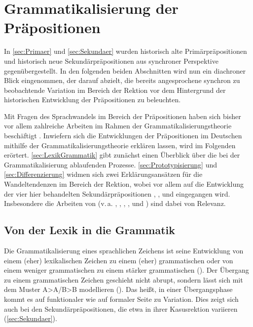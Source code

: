 \section{Grammatikalisierung der Präpositionen}\label{sec:Grammatikalisierung}
In \autoref{sec:Primaer} und \autoref{sec:Sekundaer} wurden historisch alte Primärpräpositionen und historisch neue Sekundärpräpositionen aus synchroner Perspektive gegenübergestellt. 
In den folgenden beiden Abschnitten wird nun ein diachroner Blick eingenommen, der darauf abzielt, die bereits angesprochene synchron zu beobachtende Variation im Bereich der Rektion vor dem Hintergrund der historischen Entwicklung der Präpositionen zu beleuchten.

Mit Fragen des Sprachwandels im Bereich der Präpositionen haben sich bisher vor allem zahlreiche Arbeiten im Rahmen der Grammatikalisierungstheorie beschäftigt \citep[etwa][]{Lehmann1992, Lindqvist1994,  DiMeola2000, Szczepaniak2011}. 
Inwiefern sich die Entwicklungen der Präpositionen im Deutschen mithilfe der Grammatikalisierungstheorie erklären lassen, wird im Folgenden erörtert. \autoref{sec:LexikGrammatik} gibt zunächst einen Überblick über die bei der Grammatikalisierung ablaufenden Prozesse. 
\autoref{sec:Prototypisierung} und \autoref{sec:Differenzierung} widmen sich zwei Erklärungsansätzen für die Wandeltendenzen im Bereich der Rektion, wobei vor allem auf die Entwicklung der vier hier behandelten Sekundärpräpositionen , ,  und  eingegangen wird. 
Insbesondere die Arbeiten von \citeauthor{DiMeola2000} (v.\,a. \citeyear{DiMeola1998}, \citeyear{DiMeola2001}, \citeyear{DiMeola2001}, \citeyear{DiMeola2003},  \citeyear{DiMeola2004} und \citeyear{DiMeola2011}) sind dabei von Relevanz.  
\subsection{Von der Lexik in die Grammatik}
\label{sec:LexikGrammatik}
Die Grammatikalisierung eines sprachlichen Zeichens ist seine Entwicklung von einem (eher) lexikalischen Zeichen zu einem (eher) grammatischen oder von einem weniger grammatischen zu einem stärker grammatischen (\cites[s.][303]{Lehmann.1985}[193]{Lehmann.1991}[2]{Heine.1991}). 
Der Übergang zu einem grammatischen Zeichen geschieht nicht abrupt, sondern lässt sich mit dem Muster A>A/B>B modellieren (\cites[s.][107]{Heine.1991}[15]{Lehmann.1995}). 
Das heißt, in einer Übergangsphase kommt es auf funktionaler wie auf formaler Seite zu Variation. 
Dies zeigt sich auch bei den Sekundärpräpositionen, die etwa in ihrer Kasusrektion variieren (\autoref{sec:Sekundaer}). 

